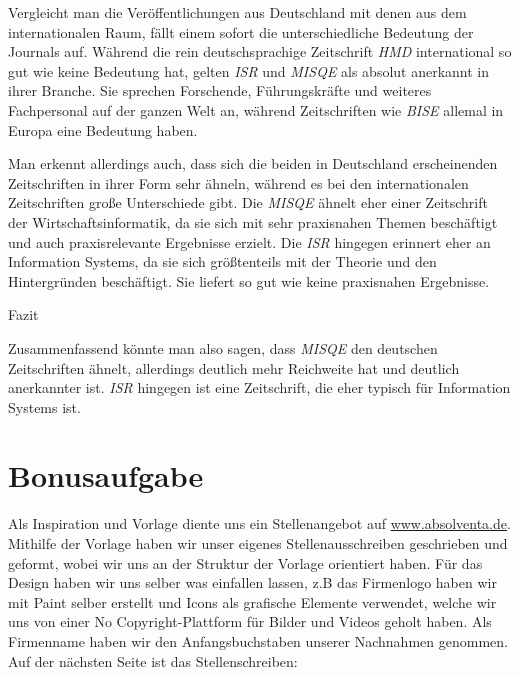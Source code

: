 \documentclass[12pt,utf8]{scrartcl}
\begin{document}
\begin{flushleft}
Vergleicht man die Veröffentlichungen aus Deutschland mit denen aus dem internationalen Raum, fällt einem sofort die unterschiedliche Bedeutung der Journals auf. Während die rein deutschsprachige Zeitschrift \emph{HMD} international so gut wie keine Bedeutung hat, gelten \emph{ISR} und \emph{MISQE} als absolut anerkannt in ihrer Branche. Sie sprechen Forschende, Führungskräfte und weiteres Fachpersonal auf der ganzen Welt an, während Zeitschriften wie \emph{BISE} allemal in Europa eine Bedeutung haben\cite{VHBJ}. 

Man erkennt allerdings auch, dass sich die beiden in Deutschland erscheinenden Zeitschriften in ihrer Form sehr ähneln, während es bei den internationalen Zeitschriften große Unterschiede gibt. Die \emph{MISQE} ähnelt eher einer Zeitschrift der Wirtschaftsinformatik, da sie  sich mit sehr praxisnahen Themen beschäftigt und auch praxisrelevante Ergebnisse erzielt. Die \emph{ISR} hingegen erinnert eher an Information Systems, da sie sich größtenteils mit der Theorie und den Hintergründen beschäftigt. Sie liefert so gut wie keine praxisnahen Ergebnisse. 
\newline

{\Large Fazit}

Zusammenfassend könnte man also sagen, dass \emph{MISQE} den deutschen Zeitschriften ähnelt, allerdings deutlich mehr Reichweite hat und deutlich anerkannter ist. \emph{ISR} hingegen ist eine Zeitschrift, die eher typisch für Information Systems ist.

\section{\label{sec:bonus}Bonusaufgabe}

Als Inspiration und Vorlage diente uns ein Stellenangebot auf \href{https://www.absolventa.de/stellenangebote/289852-p-junior-it-consultant-m-w-business-intelligence#external-job-offer}{www.absolventa.de}.\cite{online1} Mithilfe der Vorlage haben wir unser eigenes Stellenausschreiben geschrieben und geformt, wobei wir uns an der Struktur der Vorlage orientiert haben. Für das Design haben wir uns selber was einfallen lassen, z.B das Firmenlogo haben wir mit Paint selber erstellt und Icons als grafische Elemente verwendet, welche wir uns von einer No Copyright-Plattform für Bilder und Videos geholt haben.\cite{online2} Als Firmenname haben wir den Anfangsbuchstaben unserer Nachnahmen genommen. Auf der nächsten Seite ist das Stellenschreiben:


\end{flushleft}
\end{document}
